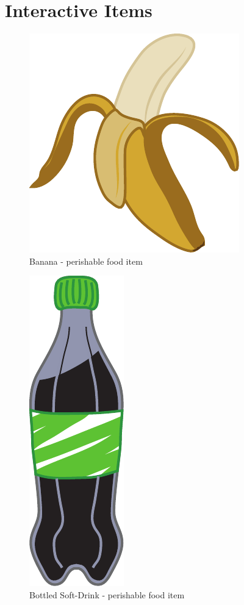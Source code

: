 \clearpage
\section{Interactive Items}
\begin{figure}[H]
	\centering\includegraphics[width=.75\linewidth, height=0.8\paperheight, keepaspectratio=true]{images/items_banana}
	\caption{Banana - perishable food item}
\end{figure}
\begin{figure}[p]
	\centering\includegraphics[height=.8\paperheight]{images/items_bottledsoftdrink}
	\caption{Bottled Soft-Drink - perishable food item}
\end{figure}
